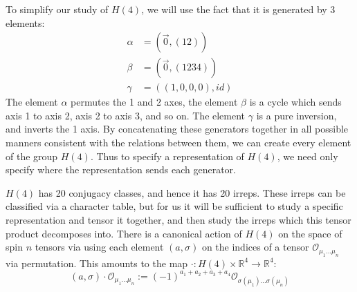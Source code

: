 \documentclass[11pt, oneside]{article}   	%
\theoremstyle{definition}
\begin{document}
To simplify our study of $H(4)$, we will use the fact that it is generated by 3 elements:
\begin{align}
	\alpha &= (\vec 0, (12)) \\ \beta &= (\vec 0, (1234)) \\ \gamma &= ((1, 0, 0, 0), id)
\end{align}
The element $\alpha$ permutes the 1 and 2 axes, the element $\beta$ is a cycle which sends axis 1 to axis 2, axis 
2 to axis 3, and so on. The element $\gamma$ is a pure inversion, and inverts the 1 axis. By concatenating these 
generators together in all possible manners consistent with the relations between them, we can create every element of 
the group $H(4)$. Thus to specify a representation of $H(4)$, we need only specify where the representation sends 
each generator. 

$H(4)$ has 20 conjugacy classes, and hence it has 20 irreps. These irreps can be classified via a character table, but for 
us it will be sufficient to study a specific representation and tensor it together, and then study the irreps which this tensor 
product decomposes into. There is a canonical action of $H(4)$ on the space of spin $n$ tensors via using each element 
$(a, \sigma)$ on the indices of a tensor $\mathcal O_{\mu_1 ... \mu_n}$ via permutation. This amounts to the map 
$\cdot : H(4)\times \mathbb R^4\rightarrow\mathbb R^4$:
\begin{equation}
	(a, \sigma)\cdot \mathcal O_{\mu_1 ... \mu_n} := (-1)^{a_1 + a_2 + a_3 + a_4} \mathcal O_{\sigma(\mu_1) ... 
	\sigma(\mu_n)}
\end{equation}
\end{document}
